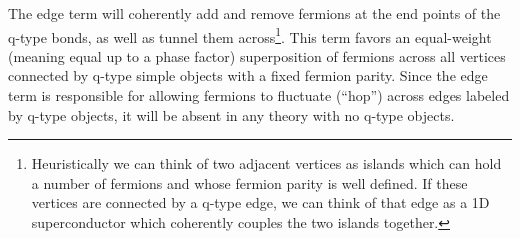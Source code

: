 \documentclass[12pt,a4paper]{article}
\newcommand{\dave}[1]{{\color{ao(english)}\footnotesize{(DA) #1}}}
\begin{document}


The edge term will coherently add and remove fermions at the end points of the q-type bonds, as well as tunnel them across\footnote{Heuristically we can think of two adjacent vertices as islands which can hold a number of fermions and whose fermion parity is well defined. 
If these vertices are connected by a q-type edge, we can think of that edge as a 1D superconductor which coherently couples the two islands together.}. 
This term favors an equal-weight (meaning equal up to a phase factor) 
superposition of fermions across all vertices connected by 
q-type simple objects with a fixed fermion parity.
Since the edge term is responsible for allowing fermions to fluctuate (``hop'') across edges labeled by q-type objects, 
it will be absent in any theory with no q-type objects.
\end{document}
